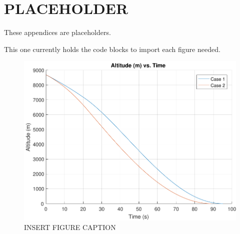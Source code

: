 \appendices
%
%
 

\chapter{PLACEHOLDER}

These appendices are placeholders.

This one currently holds the code blocks to import each figure needed.

\begin{figure}[H]
	\centering
	\begin{minipage}{4.5 in}
		\includegraphics[width=\linewidth]{Figures/altatmovsvac.pdf}
		\caption{INSERT FIGURE CAPTION \label{fig:altatmovsvac} }
	\end{minipage}
\end{figure}




